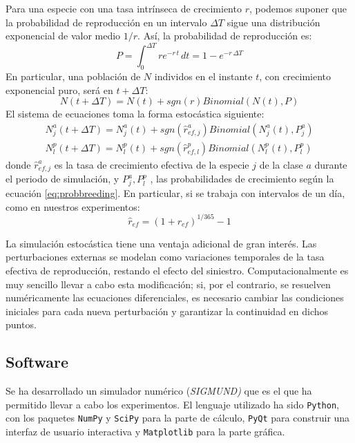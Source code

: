 Para una especie con una tasa intrínseca de crecimiento $r$, podemos suponer que la probabilidad de reproducción en un intervalo $\Delta T$ sigue una distribución exponencial de valor medio $1/r$. Así, la probabilidad de reproducción es:
\begin{equation}
\label{eq:probbreeding}
P = \int_0^{\Delta T} \! re^{-r\, t}  \, dt = 1 - e^{-r\, \Delta T}
\end{equation}
En particular, una población de $N$ individos en el instante $t$, con crecimiento exponencial puro, será en $t+\Delta T$:
\begin{equation}
N(t+\Delta T)=N(t) + sgn \left(r \right) Binomial \left( N(t),P \right)
\end{equation}
\noindent El sistema de ecuaciones toma la forma estocástica siguiente:
\begin{equation}
\begin{split}
N^{a}_{j}(t+\Delta T)=N^{a}_{j}(t) + sgn \left(\hat{r}^{a}_{ef,j} \right) Binomial \left( N^{a}_{j}(t),P^{a}_{j}\right)\\
N^{p}_{l}(t+\Delta T)=N^{p}_{l}(t) + sgn \left(\hat{r}^{p}_{ef,l} \right) Binomial \left(N^{p}_{l}(t),P^{p}_{l} \right)
\end{split}
\end{equation}
\noindent donde $\hat{r}^{a}_{ef,j}$ es la tasa de crecimiento efectiva de la especie $j$ de la clase $a$ durante el periodo de simulación, y $P^{a}_{j}, P^{p}_{l}$ , las probabilidades de crecimiento según la ecuación \ref{eq:probbreeding}. En particular, si se trabaja con intervalos de un día, como en nuestros experimentos:
\begin{equation}
\hat{r}_{ef} = (1+r_{ef})^{1/365}-1
\end{equation}

La simulación estocástica tiene una ventaja adicional de gran interés. Las perturbaciones externas se modelan como variaciones temporales de la tasa efectiva de reproducción, restando el efecto del siniestro. Computacionalmente es muy sencillo llevar a cabo esta modificación; si, por el contrario, se resuelven numéricamente las ecuaciones diferenciales, es necesario cambiar las condiciones iniciales para cada nueva perturbación y garantizar la continuidad en dichos puntos.

\subsection{Software}
Se ha desarrollado un simulador numérico (\textit{SIGMUND)} que es el que ha permitido llevar a cabo los experimentos. El lenguaje utilizado ha sido \texttt{Python}, con los paquetes \texttt{NumPy} y \texttt{SciPy} para la parte de cálculo, \texttt{PyQt} para construir una interfaz de usuario interactiva y \texttt{Matplotlib} para la parte gráfica.

